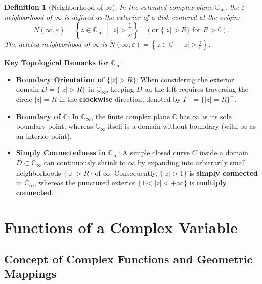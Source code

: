 \documentclass[11pt,a4paper]{article}
\theoremstyle{definitionbreak}
\newtheorem{definition}{Definition}
\theoremstyle{examplebreak}
\theoremstyle{plain}
\begin{document}
\begin{definition}[Neighborhood of $\infty$]
In the extended complex plane $\mathbb{C}_\infty$, the $\varepsilon$-neighborhood of $\infty$ is defined as the exterior of a disk centered at the origin:
\[
    N(\infty, \varepsilon) = \left\{ z \in \mathbb{C}_\infty \,\middle|\, |z| > \frac{1}{\varepsilon} \right\} \quad (\text{or } \{ |z| > R \} \text{ for } R > 0).
\]
The deleted neighborhood of $\infty$ is $\mathring{N}(\infty, \varepsilon) = \left\{ z \in \mathbb{C} \,\middle|\, |z| > \frac{1}{\varepsilon} \right\}$.
\end{definition}

\textbf{Key Topological Remarks for $\mathbb{C}_\infty$}:
\begin{itemize}
    \item \textbf{Boundary Orientation of $\{|z| > R\}$}: When considering the exterior domain $D = \{ |z| > R \}$ in $\mathbb{C}_\infty$, keeping $D$ on the left requires traversing the circle $|z| = R$ in the \textbf{clockwise} direction, denoted by $\Gamma^- = \{ |z| = R \}^-$.
    \item \textbf{Boundary of $\mathbb{C}$}: In $\mathbb{C}_\infty$, the finite complex plane $\mathbb{C}$ has $\infty$ as its sole boundary point, whereas $\mathbb{C}_\infty$ itself is a domain without boundary (with $\infty$ as an interior point).
    \item \textbf{Simply Connectedness in $\mathbb{C}_\infty$}: A simple closed curve $C$ inside a domain $D \subset \mathbb{C}_\infty$ can continuously shrink to $\infty$ by expanding into arbitrarily small neighborhoods $\{|z| > R\}$ of $\infty$. Consequently, $\{|z| > 1\}$ is \textbf{simply connected} in $\mathbb{C}_\infty$, whereas the punctured exterior $\{1 < |z| < +\infty\}$ is \textbf{multiply connected}.
\end{itemize}

\section{Functions of a Complex Variable}

\subsection{Concept of Complex Functions and Geometric Mappings}
\end{document}
